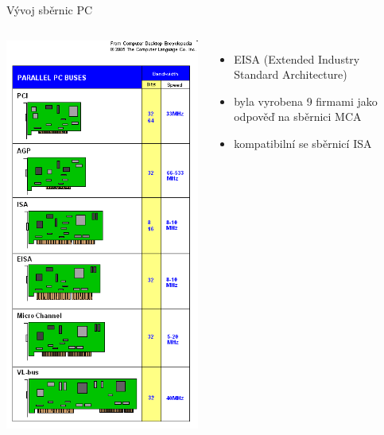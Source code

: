 \documentclass[aspectratio=43]{beamer}
\begin{document}
\begin{frame}{Vývoj sběrnic PC}
	\begin{columns}
		\includegraphics[width=0.85\linewidth]{extrahovane_obrazky/img_1_page6_0.png}
		\begin{itemize}
			\item EISA (Extended Industry Standard Architecture)
			\item byla vyrobena 9 firmami jako odpověď na sběrnici MCA
			\item kompatibilní se sběrnicí ISA

\end{itemize}
\end{columns}
\end{frame}
\end{document}
